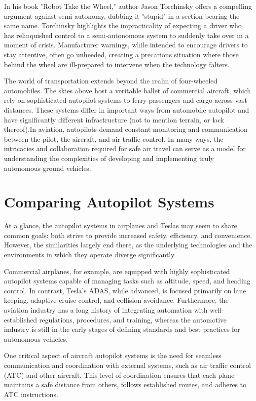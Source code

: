 In his book "Robot Take the Wheel," author Jason Torchinsky offers a compelling argument against semi-autonomy, dubbing it "stupid" in a section bearing the same name. Torchinsky highlights the impracticality of expecting a driver who has relinquished control to a semi-autonomous system to suddenly take over in a moment of crisis. Manufacturer warnings, while intended to encourage drivers to stay attentive, often go unheeded, creating a precarious situation where those behind the wheel are ill-prepared to intervene when the technology falters.

The world of transportation extends beyond the realm of four-wheeled automobiles. The skies above host a veritable ballet of commercial aircraft, which rely on sophisticated autopilot systems to ferry passengers and cargo across vast distances. These systems differ in important ways from automobile autopilot and have significantly different infrastructure (not to mention terrain, or lack thereof).In aviation, autopilots demand constant monitoring and communication between the pilot, the aircraft, and air traffic control. In many ways, the intricacies and collaboration required for safe air travel can serve as a model for understanding the complexities of developing and implementing truly autonomous ground vehicles.

\section{Comparing Autopilot Systems}

At a glance, the autopilot systems in airplanes and Teslas may seem to share common goals: both strive to provide increased safety, efficiency, and convenience. However, the similarities largely end there, as the underlying technologies and the environments in which they operate diverge significantly.

Commercial airplanes, for example, are equipped with highly sophisticated autopilot systems capable of managing tasks such as altitude, speed, and heading control. In contrast, Tesla's ADAS, while advanced, is focused primarily on lane keeping, adaptive cruise control, and collision avoidance. Furthermore, the aviation industry has a long history of integrating automation with well-established regulations, procedures, and training, whereas the automotive industry is still in the early stages of defining standards and best practices for autonomous vehicles.

One critical aspect of aircraft autopilot systems is the need for seamless communication and coordination with external systems, such as air traffic control (ATC) and other aircraft. This level of coordination ensures that each plane maintains a safe distance from others, follows established routes, and adheres to ATC instructions.

